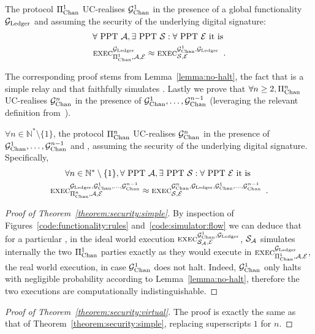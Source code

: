 \begin{theorem}
  \label{theorem:security:simple}
  The protocol $\Pi_{\mathrm{Chan}}^{1}$ UC-realises $\mathcal{G}_{\mathrm{Chan}}^{1}$ in the presence of a
  global functionality $\mathcal{G}_{\mathrm{Ledger}}$ and assuming the security of the underlying
  digital signature:
  \begin{gather*}
    \forall \text{ PPT } \mathcal{A}, \exists \text{ PPT } \mathcal{S}: \forall
    \text{ PPT } \mathcal{E} \text{ it is }\\
    \textsc{exec}^{\mathcal{G}_{\mathrm{Ledger}}}_{\Pi_{\mathrm{Chan}}^{1}, \mathcal{A}, \mathcal{E}} \approx
    \textsc{exec}^{\mathcal{G}_{\mathrm{Chan}}^{1}, \mathcal{G}_{\mathrm{Ledger}}}_{\mathcal{S}, \mathcal{E}} \enspace.
  \end{gather*}
\end{theorem}

  The corresponding proof stems from
  Lemma~\ref{lemma:no-halt}, the fact that \fchan is a simple relay and that
  \simulator faithfully simulates \pchan. Lastly we prove that $\forall n \geq 2, \Pi_{\mathrm{Chan}}^{n}$ UC-realises $\mathcal{G}_{\mathrm{Chan}}^{n}$
  in the presence of $\mathcal{G}_{\mathrm{Chan}}^{1}, \dots, \mathcal{G}_{\mathrm{Chan}}^{n-1}$
  (leveraging the relevant definition
  from~\cite{DBLP:conf/tcc/BadertscherCHTZ20}).

\begin{theorem}
  \label{theorem:security:virtual}
  $\forall n \in \mathbb{N}^* \setminus \{1\}$, the protocol $\Pi_{\mathrm{Chan}}^{n}$
  UC-realises $\mathcal{G}_{\mathrm{Chan}}^{n}$ in the presence of $\mathcal{G}_{\mathrm{Chan}}^{1}, \dots,
  \mathcal{G}_{\mathrm{Chan}}^{n-1}$ and \ledger, assuming the security of the underlying digital
  signature. Specifically,
  \begin{gather*}
    \forall n \in \mathbb{N}^* \setminus \{1\}, \forall \text{ PPT } \mathcal{A},
    \exists \text{ PPT } \mathcal{S}: \forall \text{ PPT } \mathcal{E} \text{ it
    is } \\
    \textsc{exec}^{\mathcal{G}_{\mathrm{Ledger}}, \mathcal{G}_{\mathrm{Chan}}^{1}, \dots, \mathcal{G}_{\mathrm{Chan}}^{n-1}}_{\Pi_{\mathrm{Chan}}^{n},
    \mathcal{A}, \mathcal{E}} \approx
    \textsc{exec}^{\mathcal{G}_{\mathrm{Chan}}^{n}, \mathcal{G}_{\mathrm{Ledger}}, \mathcal{G}_{\mathrm{Chan}}^{1}, \dots,
    \mathcal{G}_{\mathrm{Chan}}^{n-1}}_{\mathcal{S}, \mathcal{E}} \enspace.
  \end{gather*}
\end{theorem}

\begin{proof}[Proof of Theorem~\ref{theorem:security:simple}]
  By inspection of Figures~\ref{code:functionality:rules}
  and~\ref{code:simulator:flow} we can deduce that for a particular
  \environment, in the ideal world execution $\textsc{exec}^{\mathcal{G}_{\mathrm{Chan}}^{1},
  \mathcal{G}_{\mathrm{Ledger}}}_{\mathcal{S}_{\mathcal{A}}, \mathcal{E}}$, $\mathcal{S}_{\mathcal{A}}$
  simulates internally the two $\Pi_{\mathrm{Chan}}^{1}$ parties exactly as they would execute in
  $\textsc{exec}^{\mathcal{G}_{\mathrm{Ledger}}}_{\Pi_{\mathrm{Chan}}^{1}, \mathcal{A}, \mathcal{E}}$, the real world
  execution, in case $\mathcal{G}_{\mathrm{Chan}}^{1}$ does not halt. Indeed, $\mathcal{G}_{\mathrm{Chan}}^{1}$ only halts with
  negligible probability according to Lemma~\ref{lemma:no-halt}, therefore the
  two executions are computationally indistinguishable.
\end{proof}

\begin{proof}[Proof of Theorem~\ref{theorem:security:virtual}]
  The proof is exactly the same as that of
  Theorem~\ref{theorem:security:simple}, replacing superscripts $1$ for $n$.
\end{proof}

